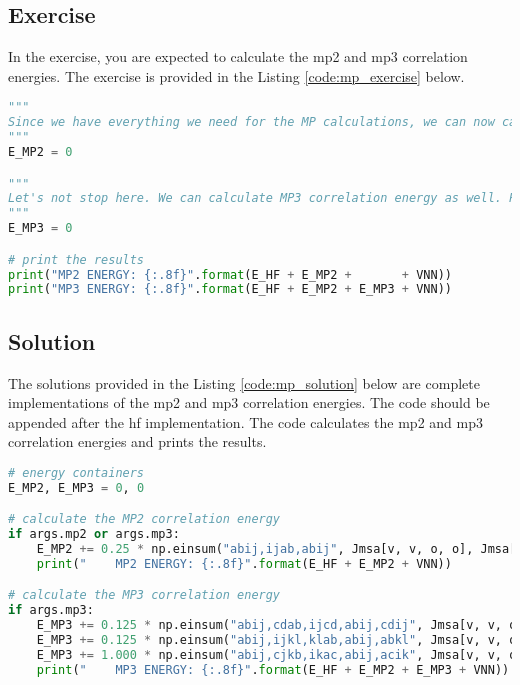 \subsection{Exercise}

In the exercise, you are expected to calculate the \acrshort{mp2} and \acrshort{mp3} correlation energies. The exercise is provided in the Listing \ref{code:mp_exercise} below.

\raggedbottom\begin{lstlisting}[language=Python, caption={\acrshort{mp2} and \acrshort{mp3} exercise code.}, label=code:mp_exercise]
"""
Since we have everything we need for the MP calculations, we can now calculate the MP2 correlation energy. The result should be stored in the "E_MP2" variable.
"""
E_MP2 = 0

"""
Let's not stop here. We can calculate MP3 correlation energy as well. Please calculate it and store it in the "E_MP3" variable.
"""
E_MP3 = 0

# print the results
print("MP2 ENERGY: {:.8f}".format(E_HF + E_MP2 +       + VNN))
print("MP3 ENERGY: {:.8f}".format(E_HF + E_MP2 + E_MP3 + VNN))
\end{lstlisting}

\subsection{Solution}

The solutions provided in the Listing \ref{code:mp_solution} below are complete implementations of the \acrshort{mp2} and \acrshort{mp3} correlation energies. The code should be appended after the \acrshort{hf} implementation. The code calculates the \acrshort{mp2} and \acrshort{mp3} correlation energies and prints the results.

\raggedbottom\begin{lstlisting}[language=Python, caption={\acrshort{mp2} and \acrshort{mp3} exercise code solution.}, label=code:mp_solution]
# energy containers
E_MP2, E_MP3 = 0, 0

# calculate the MP2 correlation energy
if args.mp2 or args.mp3:
    E_MP2 += 0.25 * np.einsum("abij,ijab,abij", Jmsa[v, v, o, o], Jmsa[o, o, v, v], Emsd, optimize=True)
    print("    MP2 ENERGY: {:.8f}".format(E_HF + E_MP2 + VNN))

# calculate the MP3 correlation energy
if args.mp3:
    E_MP3 += 0.125 * np.einsum("abij,cdab,ijcd,abij,cdij", Jmsa[v, v, o, o], Jmsa[v, v, v, v], Jmsa[o, o, v, v], Emsd, Emsd, optimize=True)
    E_MP3 += 0.125 * np.einsum("abij,ijkl,klab,abij,abkl", Jmsa[v, v, o, o], Jmsa[o, o, o, o], Jmsa[o, o, v, v], Emsd, Emsd, optimize=True)
    E_MP3 += 1.000 * np.einsum("abij,cjkb,ikac,abij,acik", Jmsa[v, v, o, o], Jmsa[v, o, o, v], Jmsa[o, o, v, v], Emsd, Emsd, optimize=True)
    print("    MP3 ENERGY: {:.8f}".format(E_HF + E_MP2 + E_MP3 + VNN))
\end{lstlisting}
